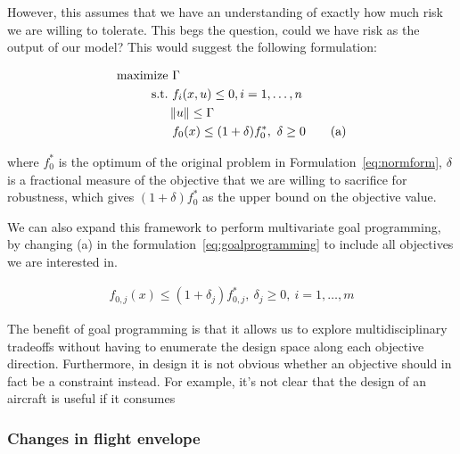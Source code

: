 However, this assumes that we have an understanding of exactly how much risk we are
willing to tolerate. This begs the question, could we have risk as the output of our
model? This would suggest the following formulation:

\begin{align*}
    \text{maximize} &~\Gamma \\
    \text{s.t.}     &~f_i(x,u) \leq 0, i = 1,\ldots,n \\
                    & \left\lVert u\right\rVert \leq \Gamma \\
                    &~f_0(x) \leq (1+\delta)f_0^*,~\delta \geq 0 \tag{a}
    \label{eq:goalprogramming}
\end{align*}

where $f_0^*$ is the optimum of the original problem in Formulation~\ref{eq:normform}, $\delta$
is a fractional measure of the objective that we are willing to sacrifice for robustness, which
gives $(1+\delta)f_0^*$ as the upper bound on the objective value.

We can also expand this framework to perform multivariate goal programming,
by changing (a) in the formulation~\ref{eq:goalprogramming} to include all
objectives we are interested in.

\begin{align*}
    f_{0,j}(x) \leq (1+\delta_j) f^*_{0,j},~\delta_j \geq 0,~i = 1,\ldots, m
    \label{eq:multigoal}
\end{align*}

The benefit of goal programming is that it allows us to explore multidisciplinary tradeoffs without
having to enumerate the design space along each objective direction. Furthermore, in design it is not obvious whether
an objective should in fact be a constraint instead. For example, it's not clear that the design
of an aircraft is useful if it consumes

\subsubsection{Changes in flight envelope}
